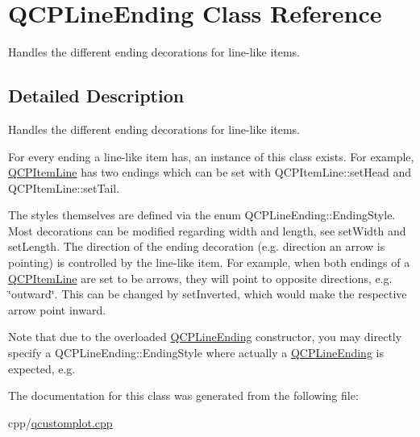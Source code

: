 \hypertarget{class_q_c_p_line_ending}{}\section{Q\+C\+P\+Line\+Ending Class Reference}
\label{class_q_c_p_line_ending}


Handles the different ending decorations for line-\/like items.  




\subsection{Detailed Description}
Handles the different ending decorations for line-\/like items. 

 For every ending a line-\/like item has, an instance of this class exists. For example, \mbox{\hyperlink{class_q_c_p_item_line}{Q\+C\+P\+Item\+Line}} has two endings which can be set with Q\+C\+P\+Item\+Line\+::set\+Head and Q\+C\+P\+Item\+Line\+::set\+Tail.

The styles themselves are defined via the enum Q\+C\+P\+Line\+Ending\+::\+Ending\+Style. Most decorations can be modified regarding width and length, see set\+Width and set\+Length. The direction of the ending decoration (e.\+g. direction an arrow is pointing) is controlled by the line-\/like item. For example, when both endings of a \mbox{\hyperlink{class_q_c_p_item_line}{Q\+C\+P\+Item\+Line}} are set to be arrows, they will point to opposite directions, e.\+g. \char`\"{}outward\char`\"{}. This can be changed by set\+Inverted, which would make the respective arrow point inward.

Note that due to the overloaded \mbox{\hyperlink{class_q_c_p_line_ending}{Q\+C\+P\+Line\+Ending}} constructor, you may directly specify a Q\+C\+P\+Line\+Ending\+::\+Ending\+Style where actually a \mbox{\hyperlink{class_q_c_p_line_ending}{Q\+C\+P\+Line\+Ending}} is expected, e.\+g. 
\begin{DoxyCodeInclude}
\end{DoxyCodeInclude}


The documentation for this class was generated from the following file\+:\begin{DoxyCompactItemize}
\item 
cpp/\mbox{\hyperlink{qcustomplot_8cpp}{qcustomplot.\+cpp}}\end{DoxyCompactItemize}
